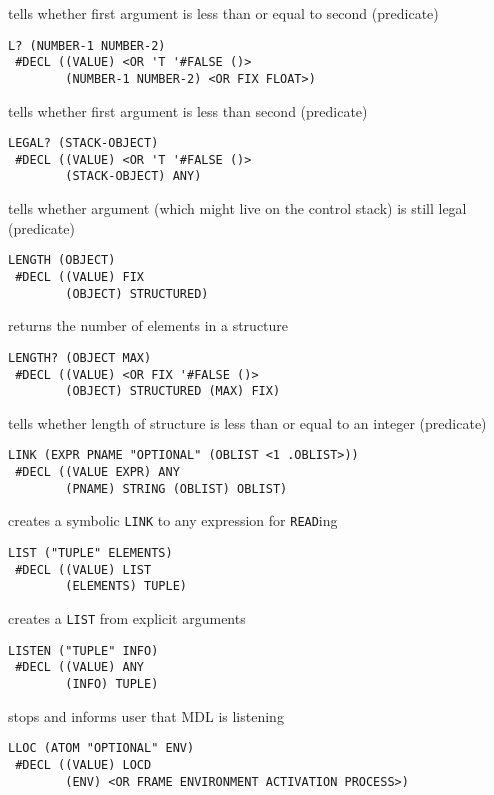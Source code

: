 \documentclass[a4paper]{scrbook}
\begin{document}
tells whether first argument is less than or equal to second (predicate)

\begin{verbatim}
L? (NUMBER-1 NUMBER-2)
 #DECL ((VALUE) <OR 'T '#FALSE ()>
        (NUMBER-1 NUMBER-2) <OR FIX FLOAT>)
\end{verbatim}

tells whether first argument is less than second (predicate)

\begin{verbatim}
LEGAL? (STACK-OBJECT)
 #DECL ((VALUE) <OR 'T '#FALSE ()>
        (STACK-OBJECT) ANY)
\end{verbatim}

tells whether argument (which might live on the control stack) is still legal (predicate)

\begin{verbatim}
LENGTH (OBJECT)
 #DECL ((VALUE) FIX
        (OBJECT) STRUCTURED)
\end{verbatim}

returns the number of elements in a structure

\begin{verbatim}
LENGTH? (OBJECT MAX)
 #DECL ((VALUE) <OR FIX '#FALSE ()>
        (OBJECT) STRUCTURED (MAX) FIX)
\end{verbatim}

tells whether length of structure is less than or equal to an integer (predicate)

\begin{verbatim}
LINK (EXPR PNAME "OPTIONAL" (OBLIST <1 .OBLIST>))
 #DECL ((VALUE EXPR) ANY
        (PNAME) STRING (OBLIST) OBLIST)
\end{verbatim}

creates a symbolic \texttt{LINK} to any expression for \texttt{READ}ing

\begin{verbatim}
LIST ("TUPLE" ELEMENTS)
 #DECL ((VALUE) LIST
        (ELEMENTS) TUPLE)
\end{verbatim}

creates a \texttt{LIST} from explicit arguments

\begin{verbatim}
LISTEN ("TUPLE" INFO)
 #DECL ((VALUE) ANY
        (INFO) TUPLE)
\end{verbatim}

stops and informs user that MDL is listening

\begin{verbatim}
LLOC (ATOM "OPTIONAL" ENV)
 #DECL ((VALUE) LOCD
        (ENV) <OR FRAME ENVIRONMENT ACTIVATION PROCESS>)
\end{verbatim}
\end{document}
